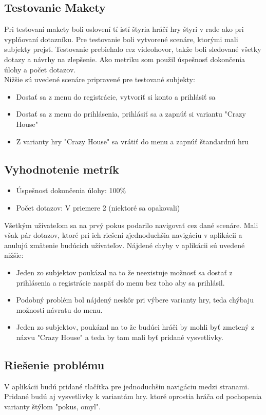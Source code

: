 \documentclass[a4paper, 11pt, onecolumn]{article}
\begin{document}
\subsection*{Testovanie Makety}
Pri testovaní makety boli oslovení tí istí štyria hráčí hry štyri v rade ako pri
vyplňovaní dotazníku. Pre testovanie boli vytvorené scenáre, ktorými mali 
subjekty prejsť. Testovanie prebiehalo cez videohovor, takže boli sledované všetky
dotazy a návrhy na zlepšenie. Ako metriku som použil úspešnosť dokončenia úlohy a
počet dotazov.\\
Nižšie sú uvedené scenáre pripravené pre testované subjekty:
\begin{itemize}
  \item Dostať sa z menu do registrácie, vytvoriť si konto a prihlásiť sa
  \item Dostať sa z menu do prihlásenia, prihlásiť sa a zapnúť si variantu "Crazy House"
  \item Z varianty hry "Crazy House" sa vrátiť do menu a zapnúť štandardnú hru
\end{itemize}
\subsection*{Vyhodnotenie metrík}
\begin{itemize}
  \item Úspešnosť dokončenia úlohy: 100\%
  \item Počet dotazov: V priemere 2 (niektoré sa opakovali)
\end{itemize}
Všetkým užívateľom sa na prvý pokus podarilo navigovať cez dané scenáre. 
Mali však pár dotazov, ktoré pri ich riešení zjednoduchšia navigáciu v aplikácii a anulujú zmätenie budúcich užívateľov.
Nájdené chyby v aplikácii sú uvedené nižšie:
\begin{itemize}
  \item Jeden zo subjektov poukázal na to že neexistuje možnosť sa dostať z prihlásenia a registrácie naspäť do menu bez toho aby sa prihlásil.
  \item Podobný problém bol nájdený neskôr pri výbere varianty hry, teda chýbaju možnosti návratu do menu.
  \item Jeden zo subjektov, poukázal na to že budúci hráči by mohli byť zmetený z názvu "Crazy House" a teda by tam mali byť pridané vysvetlivky.
\end{itemize}
\subsection*{Riešenie problému}
V aplikácii budú pridané tlačítka pre jednoduchšiu navigáciu medzi stranami.
Pridané budú aj vysvetlivky k variantám hry. ktoré oprostia hráča od pochopenia varianty
štýlom "pokus, omyl".
\end{document}
